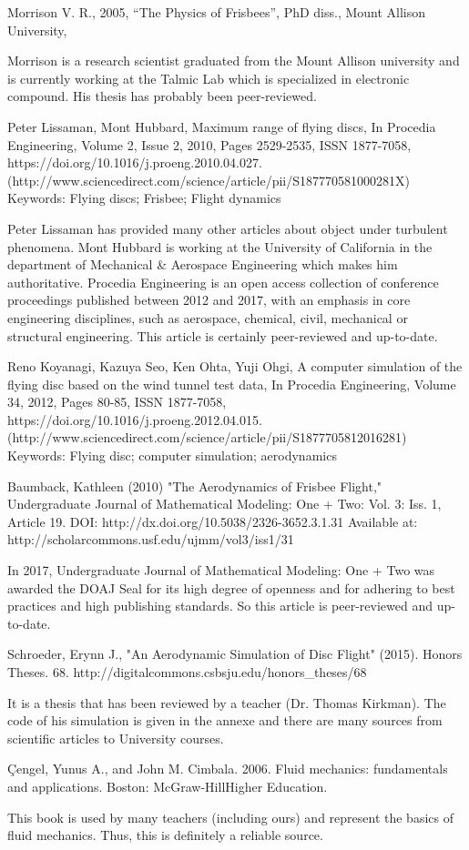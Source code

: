 \documentclass[10pt,a4paper]{report}
\begin{document}
\begin{thebibliography}{9}
  
  Morrison V. R.,
  2005,
  “The Physics of Frisbees”,
  PhD diss.,
  Mount Allison University,
  
  Morrison is a research scientist graduated from the Mount Allison university and is currently working at the Talmic Lab which is specialized in electronic compound. His thesis has probably been peer-reviewed.
	
Peter Lissaman, Mont Hubbard, Maximum range of flying discs, In Procedia Engineering, Volume 2, Issue 2, 2010, Pages 2529-2535, ISSN 1877-7058, https://doi.org/10.1016/j.proeng.2010.04.027.
(http://www.sciencedirect.com/science/article/pii/S187770581000281X)
Keywords: Flying discs; Frisbee; Flight dynamics

Peter Lissaman has provided many other articles about object under turbulent phenomena. Mont Hubbard is working at the University of California in the department of Mechanical \& Aerospace Engineering which makes him authoritative. Procedia Engineering is an open access collection of conference proceedings published between 2012 and 2017, with an emphasis in core engineering disciplines, such as aerospace, chemical, civil, mechanical or structural engineering. This article is certainly peer-reviewed and up-to-date.
  
Reno Koyanagi, Kazuya Seo, Ken Ohta, Yuji Ohgi, A computer simulation of the flying disc based on the wind tunnel test data, In Procedia Engineering, Volume 34, 2012, Pages 80-85, ISSN 1877-7058, https://doi.org/10.1016/j.proeng.2012.04.015.
(http://www.sciencedirect.com/science/article/pii/S1877705812016281)
Keywords: Flying disc; computer simulation; aerodynamics
  
Baumback, Kathleen (2010) "The Aerodynamics of Frisbee Flight," Undergraduate Journal of Mathematical Modeling: One + Two: Vol. 3: Iss. 1, Article 19.
DOI: http://dx.doi.org/10.5038/2326-3652.3.1.31
Available at: http://scholarcommons.usf.edu/ujmm/vol3/iss1/31

In 2017, Undergraduate Journal of Mathematical Modeling: One + Two was awarded the DOAJ Seal for its high degree of openness and for adhering to best practices and high publishing standards. So this article is peer-reviewed and up-to-date.
  
Schroeder, Erynn J., "An Aerodynamic Simulation of Disc Flight" (2015). Honors Theses. 68.
http://digitalcommons.csbsju.edu/honors\_theses/68

It is a thesis that has been reviewed by a teacher (Dr. Thomas Kirkman). The code of his simulation is given in the annexe and there are many sources from scientific articles to University courses.
  
  \c{C}engel, Yunus A., and John M. Cimbala. 2006. Fluid mechanics: fundamentals and applications. Boston: McGraw-HillHigher Education.
  
  This book is used by many teachers (including ours) and represent the basics of fluid mechanics. Thus, this is definitely a reliable source.

\end{thebibliography}
\end{document}
